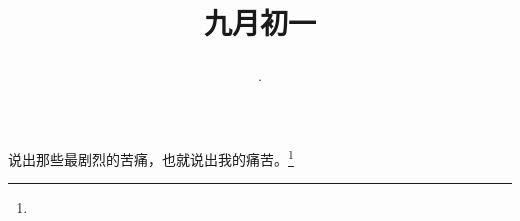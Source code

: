 \title{\date[d=3,m=10,y=2024][year:cn-y,年,month:cn,day:cn,日,·,weekday]·九月初一 }
说出那些最剧烈的苦痛，也就说出我的痛苦。\footnote{ }

